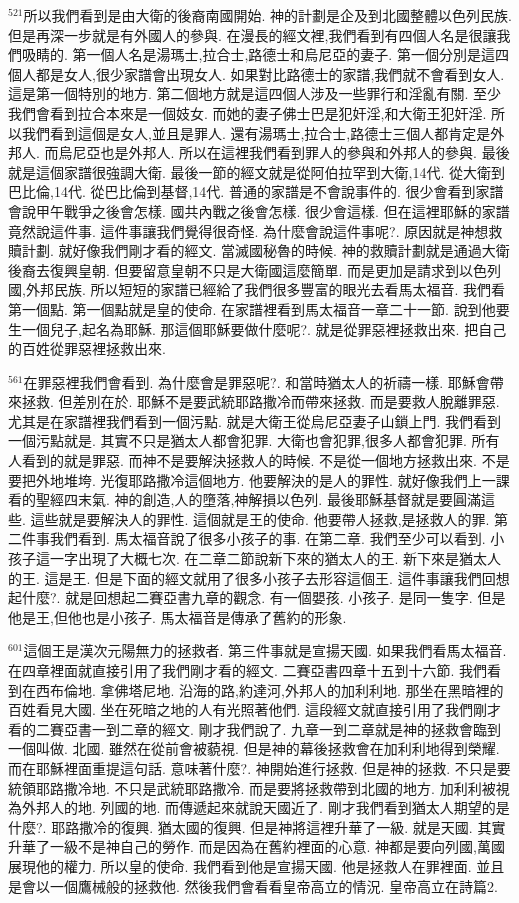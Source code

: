 \documentclass{book}
\begin{document}
$^{521}$所以我們看到是由大衛的後裔南國開始.
神的計劃是企及到北國整體以色列民族.
但是再深一步就是有外國人的參與.
在漫長的經文裡,我們看到有四個人名是很讓我們吸睛的.
第一個人名是湯瑪士,拉合士,路德士和烏尼亞的妻子.
第一個分別是這四個人都是女人,很少家譜會出現女人.
如果對比路德士的家譜,我們就不會看到女人.
這是第一個特別的地方.
第二個地方就是這四個人涉及一些罪行和淫亂有關.
至少我們會看到拉合本來是一個妓女.
而她的妻子佛士巴是犯奸淫,和大衛王犯奸淫.
所以我們看到這個是女人,並且是罪人.
還有湯瑪士,拉合士,路德士三個人都肯定是外邦人.
而烏尼亞也是外邦人.
所以在這裡我們看到罪人的參與和外邦人的參與.
最後就是這個家譜很強調大衛.
最後一節的經文就是從阿伯拉罕到大衛,14代.
從大衛到巴比倫,14代.
從巴比倫到基督,14代.
普通的家譜是不會說事件的.
很少會看到家譜會說甲午戰爭之後會怎樣.
國共內戰之後會怎樣.
很少會這樣.
但在這裡耶穌的家譜竟然說這件事.
這件事讓我們覺得很奇怪.
為什麼會說這件事呢?.
原因就是神想救贖計劃.
就好像我們剛才看的經文.
當滅國秘魯的時候.
神的救贖計劃就是通過大衛後裔去復興皇朝.
但要留意皇朝不只是大衛國這麼簡單.
而是更加是請求到以色列國,外邦民族.
所以短短的家譜已經給了我們很多豐富的眼光去看馬太福音.
我們看第一個點.
第一個點就是皇的使命.
在家譜裡看到馬太福音一章二十一節.
說到他要生一個兒子,起名為耶穌.
那這個耶穌要做什麼呢?.
就是從罪惡裡拯救出來.
把自己的百姓從罪惡裡拯救出來.

$^{561}$在罪惡裡我們會看到.
為什麼會是罪惡呢?.
和當時猶太人的祈禱一樣.
耶穌會帶來拯救.
但差別在於.
耶穌不是要武統耶路撒冷而帶來拯救.
而是要救人脫離罪惡.
尤其是在家譜裡我們看到一個污點.
就是大衛王從烏尼亞妻子山鎖上門.
我們看到一個污點就是.
其實不只是猶太人都會犯罪.
大衛也會犯罪,很多人都會犯罪.
所有人看到的就是罪惡.
而神不是要解決拯救人的時候.
不是從一個地方拯救出來.
不是要把外地堆垮.
光復耶路撒冷這個地方.
他要解決的是人的罪性.
就好像我們上一課看的聖經四末氣.
神的創造,人的墮落,神解損以色列.
最後耶穌基督就是要圓滿這些.
這些就是要解決人的罪性.
這個就是王的使命.
他要帶人拯救,是拯救人的罪.
第二件事我們看到.
馬太福音說了很多小孩子的事.
在第二章.
我們至少可以看到.
小孩子這一字出現了大概七次.
在二章二節說新下來的猶太人的王.
新下來是猶太人的王.
這是王.
但是下面的經文就用了很多小孩子去形容這個王.
這件事讓我們回想起什麼?.
就是回想起二賽亞書九章的觀念.
有一個嬰孩.
小孩子.
是同一隻字.
但是他是王,但他也是小孩子.
馬太福音是傳承了舊約的形象.

$^{601}$這個王是漢次元陽無力的拯救者.
第三件事就是宣揚天國.
如果我們看馬太福音.
在四章裡面就直接引用了我們剛才看的經文.
二賽亞書四章十五到十六節.
我們看到在西布倫地.
拿佛塔尼地.
沿海的路,約達河,外邦人的加利利地.
那坐在黑暗裡的百姓看見大國.
坐在死暗之地的人有光照著他們.
這段經文就直接引用了我們剛才看的二賽亞書一到二章的經文.
剛才我們說了.
九章一到二章就是神的拯救會臨到一個叫做.
北國.
雖然在從前會被藐視.
但是神的幕後拯救會在加利利地得到榮耀.
而在耶穌裡面重提這句話.
意味著什麼?.
神開始進行拯救.
但是神的拯救.
不只是要統領耶路撒冷地.
不只是武統耶路撒冷.
而是要將拯救帶到北國的地方.
加利利被視為外邦人的地.
列國的地.
而傳遞起來就說天國近了.
剛才我們看到猶太人期望的是什麼?.
耶路撒冷的復興.
猶太國的復興.
但是神將這裡升華了一級.
就是天國.
其實升華了一級不是神自己的勞作.
而是因為在舊約裡面的心意.
神都是要向列國,萬國展現他的權力.
所以皇的使命.
我們看到他是宣揚天國.
他是拯救人在罪裡面.
並且是會以一個鷹械般的拯救他.
然後我們會看看皇帝高立的情況.
皇帝高立在詩篇2.
\end{document}
